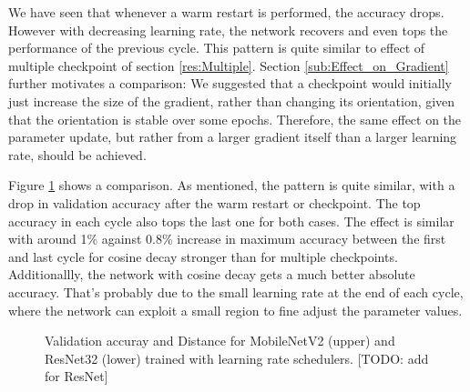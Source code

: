 We have seen that whenever a warm restart is performed, the accuracy drops.
However with decreasing learning rate, the network recovers and even tops the
performance of the previous cycle. This pattern is quite similar to effect of
multiple checkpoint of section \ref{res:Multiple}. Section
\ref{sub:Effect_on_Gradient} further motivates a comparison: We suggested that a
checkpoint would initially just increase the size of the gradient, rather than
changing its orientation, given that the orientation is stable over some epochs.
Therefore, the same effect on the parameter update, but rather from a larger
gradient itself than a larger learning rate, should be achieved.

Figure \ref{fig:Cosine_Multiple} shows a comparison. As mentioned, the pattern
is quite similar, with a drop in validation accuracy after the warm restart or
checkpoint. The top accuracy in each cycle also tops the last one for both
cases. The effect is similar with around 1\% against 0.8\% increase in maximum accuracy
between the first and last cycle for cosine decay stronger than for multiple
checkpoints. Additionallly, the network with cosine decay gets a much better absolute
accuracy. That's probably due to the small learning rate at the end of each
cycle, where the network can exploit a small region to fine adjust the parameter
values.

\begin{figure}[h]\label{fig:Cosine_Multiple}
    \begin{center}
        \caption{Validation accuray and Distance for MobileNetV2 (upper) and ResNet32 (lower) trained with learning rate schedulers. [TODO: add for ResNet]}
    \end{center}
\end{figure}

